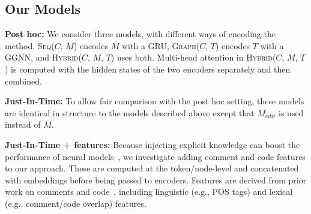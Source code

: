 \documentclass[letterpaper]{article} %
\newcommand{\Comment}{$C$}
\newcommand{\NewCode}{$M$}
\newcommand{\Posthoc}{post hoc}
\newcommand{\EditCode}{$M_{edit}$}
\newcommand{\NewTree}{$T$}
\newcommand{\SeqModel}{\textsc{Seq}}
\newcommand{\GraphModel}{\textsc{Graph}}
\newcommand{\HybridModel}{\textsc{Hybrid}}
\newcommand{\PosthocSeq}{\SeqModel{}(\Comment{}, \NewCode{})}
\newcommand{\PosthocGraph}{\GraphModel{}(\Comment{}, \NewTree{})}
\newcommand{\PosthocHybrid}{\HybridModel{}(\Comment{}, \NewCode{}, \NewTree{})}
\begin{document}
\subsection{Our Models}
\label{subsection:models}
\noindent\textbf{Post hoc:} We consider three models, with different ways of encoding the method. \PosthocSeq{} encodes \NewCode{} with a GRU, \PosthocGraph{} encodes \NewTree{} with a GGNN, and \PosthocHybrid{} uses both. Multi-head attention in \PosthocHybrid{} is computed with the hidden states of the two encoders separately and then combined.

\noindent\textbf{Just-In-Time:} To allow fair comparison with the \Posthoc{} setting, these models are identical in structure to the models described above except that \EditCode{} is used instead of \NewCode{}.

\noindent\textbf{Just-In-Time + features:}
Because injecting explicit knowledge can boost the performance of neural models~\cite{ChenExplicitFeatures,XuanExternalFeatures}, we investigate adding comment and code features to our approach. These are computed at the token/node-level and concatenated with embeddings before being passed to encoders.  Features are derived from prior work on comments and code~\cite{panthaplackel2020associating, panthaplackel2020update}, including linguistic (e.g., POS tags) and lexical (e.g., comment/code overlap) features.
\end{document}
